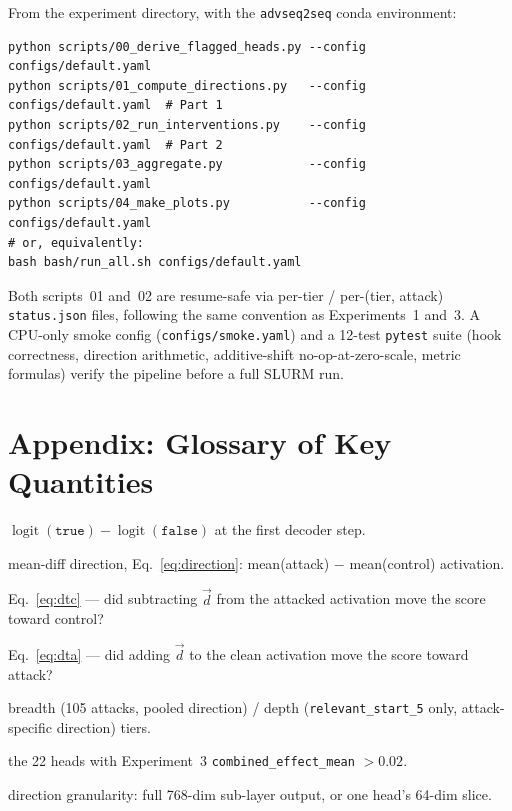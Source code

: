 \documentclass[11pt]{article}
\newcommand{\score}{\operatorname{score}}
\newcommand{\dirvec}{\ensuremath{\vec{d}}}
\newcommand{\dtc}{\ensuremath{\Delta_{\text{control}}}}
\newcommand{\dta}{\ensuremath{\Delta_{\text{attack}}}}
\begin{document}
From the experiment directory, with the \texttt{advseq2seq} conda
environment:

\begin{lstlisting}
python scripts/00_derive_flagged_heads.py --config configs/default.yaml
python scripts/01_compute_directions.py   --config configs/default.yaml  # Part 1
python scripts/02_run_interventions.py    --config configs/default.yaml  # Part 2
python scripts/03_aggregate.py            --config configs/default.yaml
python scripts/04_make_plots.py           --config configs/default.yaml
# or, equivalently:
bash bash/run_all.sh configs/default.yaml
\end{lstlisting}

\noindent Both scripts~01 and~02 are resume-safe via per-tier / per-(tier,
attack) \texttt{status.json} files, following the same convention as
Experiments~1 and~3. A CPU-only smoke config
(\texttt{configs/smoke.yaml}) and a 12-test \texttt{pytest} suite
(hook correctness, direction arithmetic, additive-shift no-op-at-zero-scale,
metric formulas) verify the pipeline before a full SLURM run.

\section*{Appendix: Glossary of Key Quantities}

\begin{description}[leftmargin=1.6em,style=nextline]
  \item[$\score$] $\operatorname{logit}(\texttt{true})-\operatorname{logit}(\texttt{false})$ at the first decoder step.
  \item[$\dirvec$] mean-diff direction, Eq.~\eqref{eq:direction}: mean(attack) $-$ mean(control) activation.
  \item[$\dtc$] Eq.~\eqref{eq:dtc} --- did subtracting $\dirvec$ from the attacked activation move the score toward control?
  \item[$\dta$] Eq.~\eqref{eq:dta} --- did adding $\dirvec$ to the clean activation move the score toward attack?
  \item[grid\_a / grid\_b] breadth (105 attacks, pooled direction) / depth (\texttt{relevant\_start\_5} only, attack-specific direction) tiers.
  \item[flagged heads] the 22 heads with Experiment~3 \texttt{combined\_effect\_mean} $> 0.02$.
  \item[whole-vector / per-head] direction granularity: full 768-dim sub-layer output, or one head's 64-dim slice.
\end{description}
\end{document}
